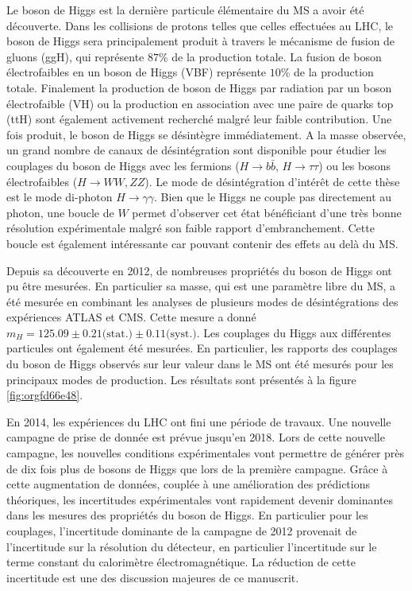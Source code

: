 Le boson de Higgs est la dernière particule élémentaire du MS a avoir été découverte.
Dans les collisions de protons telles que celles effectuées au LHC, le boson de Higgs sera principalement produit à travers le mécanisme de fusion de gluons (ggH), qui représente $87\%$ de la production totale.
La fusion de boson électrofaibles en un boson de Higgs (VBF) représente $10\%$ de la production totale.
Finalement la production de boson de Higgs par radiation par un boson électrofaible (VH) ou la production en association avec une paire de quarks top (ttH) sont également activement recherché malgré leur faible contribution.
Une fois produit, le boson de Higgs se désintègre immédiatement.
A la masse observée, un grand nombre de canaux de désintégration sont disponible pour étudier les couplages du boson de Higgs avec les fermions ($H\rightarrow b\bar{b}$, $H\rightarrow \tau\tau$) ou les bosons électrofaibles ($H\rightarrow WW, ZZ$).
Le mode de désintégration d'intérêt de cette thèse est le mode di-photon $H\rightarrow \gamma\gamma$.
Bien que le Higgs ne couple pas directement au photon, une boucle de $W$ permet d'observer cet état bénéficiant d'une très bonne résolution expérimentale malgré son faible rapport d'embranchement.
Cette boucle est également intéressante car pouvant contenir des effets au delà du MS.

Depuis sa découverte en 2012, de nombreuses propriétés du boson de Higgs ont pu être mesurées.
En particulier sa masse, qui est une paramètre libre du MS, a été mesurée en combinant les analyses de plusieurs modes de désintégrations des expériences ATLAS et CMS.
Cette mesure a donné $m_H = 125.09 \pm 0.21 \text{(stat.)} \pm 0.11 \text{(syst.)}$.
Les couplages du Higgs aux différentes particules ont également été mesurées.
En particulier, les rapports des couplages du boson de Higgs observés sur leur valeur dans le MS  ont été mesurés pour les principaux modes de production.
Les résultats sont présentés à la figure \ref{fig:orgfd66e48}.

En 2014, les expériences du LHC ont fini une période de travaux.
Une nouvelle campagne de prise de donnée est prévue jusqu'en 2018.
Lors de cette nouvelle campagne, les nouvelles conditions expérimentales vont permettre de générer près de dix fois plus de bosons de Higgs que lors de la première campagne.
Grâce à cette augmentation de données, couplée à une amélioration des prédictions théoriques, les incertitudes expérimentales vont rapidement devenir dominantes dans les mesures des propriétés du boson de Higgs.
En particulier pour les couplages, l'incertitude dominante de la campagne de 2012 provenait de l'incertitude sur la résolution du détecteur, en particulier l'incertitude sur le terme constant du calorimètre électromagnétique.
La réduction de cette incertitude est une des discussion majeures de ce manuscrit.

